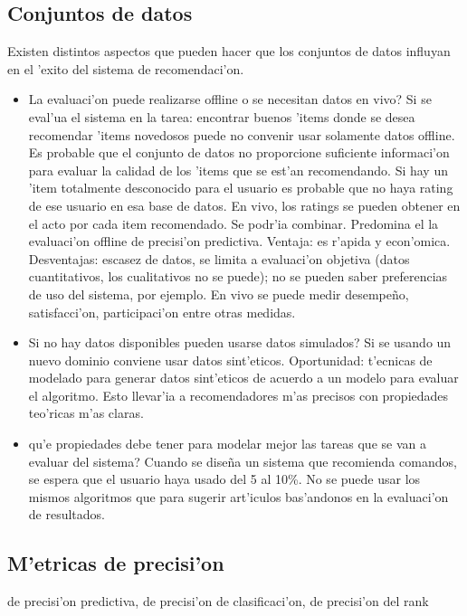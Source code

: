 \documentclass[11pt]{article}
\begin{document}
\subsection{Conjuntos de datos}
Existen distintos aspectos que pueden hacer que los conjuntos de datos influyan en el 'exito del sistema de recomendaci'on.
\begin{itemize}
\item La evaluaci'on puede realizarse offline o se necesitan datos en vivo? Si se eval'ua el sistema en la tarea: encontrar buenos 'items donde se desea recomendar 'items novedosos puede no convenir usar solamente datos offline. Es probable que el conjunto de datos no proporcione suficiente informaci'on para evaluar la calidad de los 'items que se est'an recomendando. Si hay un 'item totalmente desconocido para el usuario es probable que no haya rating de ese usuario en esa base de datos. En vivo, los ratings se pueden obtener en el acto por cada item recomendado. Se podr'ia combinar. Predomina el la evaluaci'on offline de precisi'on predictiva. Ventaja: es r'apida y econ'omica. Desventajas: escasez de datos, se limita a evaluaci'on objetiva (datos cuantitativos, los cualitativos no se puede); no se pueden saber preferencias de uso del sistema, por ejemplo. En vivo se puede medir desempe\~{n}o, satisfacci'on, participaci'on entre otras medidas.
\item Si no hay datos disponibles \textquestiondown pueden usarse datos simulados? Si se usando un nuevo dominio conviene usar datos sint'eticos. Oportunidad: t'ecnicas de modelado para generar datos sint'eticos de acuerdo a un modelo para evaluar el algoritmo. Esto llevar'ia a recomendadores m'as precisos con propiedades teo'ricas m'as claras.
\item \textquestiondown qu'e propiedades debe tener para modelar mejor las tareas que se van a evaluar del sistema? Cuando se dise\~{n}a un sistema que recomienda comandos, se espera que el usuario haya usado del 5 al 10\%. No se puede usar los mismos algoritmos que para sugerir art'iculos bas'andonos en la evaluaci'on de resultados.
\end{itemize}
\subsection{M'etricas de precisi'on}
de precisi'on predictiva, de precisi'on de clasificaci'on, de precisi'on del rank

\end{document}
